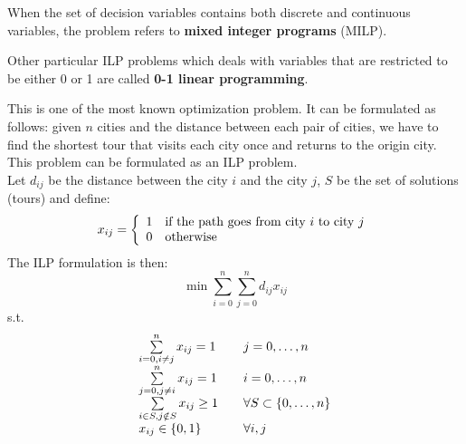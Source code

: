 When the set of decision variables contains both discrete and continuous variables, the problem refers to \textbf{mixed integer programs} (MILP).

Other particular ILP problems which deals with variables that are restricted to be either 0 or 1 are called \textbf{0-1 linear programming}.

\begin{example}
This is one of the most known optimization problem. It can be formulated as follows: given $n$ cities and the distance between each pair of cities, we have to find the shortest tour that visits each city once and returns to the origin city. This problem can be formulated as an ILP problem.\\
Let $d_{ij}$ be the distance between the city $i$ and the city $j$, $S$ be the set of solutions (tours) and define:
\begin{equation*}
x_{ij} = \left\{
	\begin{array}{l l}
	1 & \text{if the path goes from city $i$ to city $j$}\\
	0 & \text{otherwise}
	\end{array}
\right.
\end{equation*}
The ILP formulation is then:
\begin{equation}
\min \sum\limits_{i=0}^{n} \sum\limits_{j=0}^{n} d_{ij} x_{ij}
\end{equation}
s.t.
\begin{equation*}
\begin{array}{l l}
\sum\limits_{i=0, i \neq j}^{n} x_{ij} = 1 & \quad j = 0, \dots, n\\
\sum\limits_{j=0, j \neq i}^{n} x_{ij} = 1 & \quad i = 0, \dots, n\\
\sum\limits_{i \in S, j \notin S} x_{ij} \geq 1 & \quad \forall S \subset \{0, \dots, n\}\\
x_{ij} \in \{0, 1\} & \quad \forall i,j
\end{array}
\end{equation*}

\end{example}

